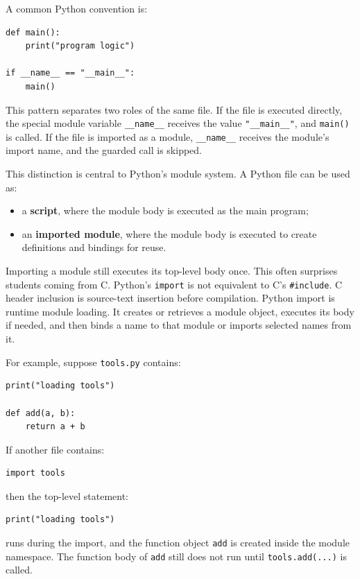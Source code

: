 \documentclass[a4paper,twoside]{report}
\begin{document}
A common Python convention is:

\begin{verbatim}
def main():
    print("program logic")

if __name__ == "__main__":
    main()
\end{verbatim}

This pattern separates two roles of the same file. If the file is executed directly, the special module variable \texttt{\_\_name\_\_} receives the value \texttt{"\_\_main\_\_"}, and \texttt{main()} is called. If the file is imported as a module, \texttt{\_\_name\_\_} receives the module's import name, and the guarded call is skipped.

This distinction is central to Python's module system. A Python file can be used as:

\begin{itemize}
    \item a \textbf{script}, where the module body is executed as the main program;
    \item an \textbf{imported module}, where the module body is executed to create definitions and bindings for reuse.
\end{itemize}

Importing a module still executes its top-level body once. This often surprises students coming from C. Python's \texttt{import} is not equivalent to C's \texttt{\#include}. C header inclusion is source-text insertion before compilation. Python import is runtime module loading. It creates or retrieves a module object, executes its body if needed, and then binds a name to that module or imports selected names from it.

For example, suppose \texttt{tools.py} contains:

\begin{verbatim}
print("loading tools")

def add(a, b):
    return a + b
\end{verbatim}

If another file contains:

\begin{verbatim}
import tools
\end{verbatim}

then the top-level statement:

\begin{verbatim}
print("loading tools")
\end{verbatim}

runs during the import, and the function object \texttt{add} is created inside the module namespace. The function body of \texttt{add} still does not run until \texttt{tools.add(...)} is called.
\end{document}
